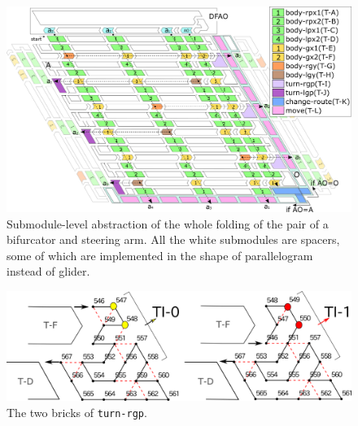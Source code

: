 \documentclass[runningheads]{llncs}
\begin{document}
\begin{figure}[tb]
\centering
\includegraphics[width=\linewidth]{Figs/overall_turn_part.png}
\caption{Submodule-level abstraction of the whole folding of the pair of a bifurcator and steering arm. 
All the white submodules are spacers, some of which are implemented in the shape of parallelogram instead of glider.}
\label{fig:turner}
\end{figure}

\begin{figure}
\vspace*{-7mm}
\centering
\includegraphics[width=\linewidth]{Figs/turn-rgp.png}
\caption{The two bricks of \texttt{turn-rgp}.}
\label{fig:turn-rgp}
\end{figure}
\end{document}
